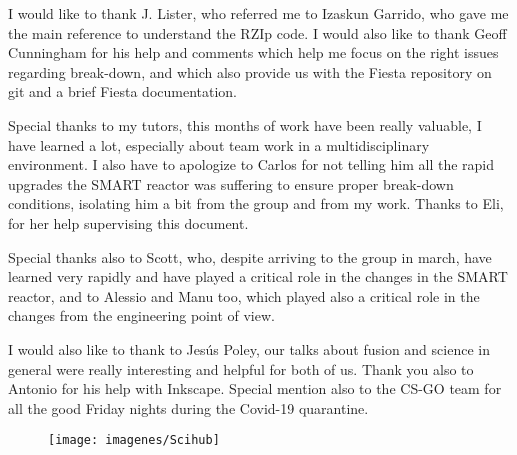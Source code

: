 \documentclass[a4paper,12pt,oneside]{book}
\begin{document}
I would like to thank J. Lister, who referred me to Izaskun Garrido, who gave me the main reference to understand the RZIp code.  I would also like to thank Geoff Cunningham for his help and comments which help me focus on the right issues regarding break-down, and which also provide us with the Fiesta repository on git and a brief Fiesta documentation.

Special thanks to my tutors, this months of work have been really valuable, I have learned a lot, especially about team work in a multidisciplinary environment. I also have to apologize to Carlos for not telling him all the rapid upgrades the SMART reactor was suffering to ensure proper break-down conditions, isolating him a bit from the group and from my work. Thanks to Eli, for her help supervising this document.

Special thanks also to Scott, who, despite arriving to the group in march,  have learned very rapidly and have played a critical role in the changes in the SMART reactor, and to Alessio and Manu too, which played also a critical role in the changes from the engineering point of view. 

I would also like to thank to Jesús Poley, our talks about fusion and science in general were really interesting and helpful for both of us. Thank you also to Antonio for his help with Inkscape. Special mention also to the CS-GO team for all the good Friday nights during the Covid-19 quarantine.




\begin{figure}[b]
\centering
\texttt{[image: imagenes/Scihub]}
\end{figure}



\tableofcontents %
\cleardoublepage %



\end{document}
